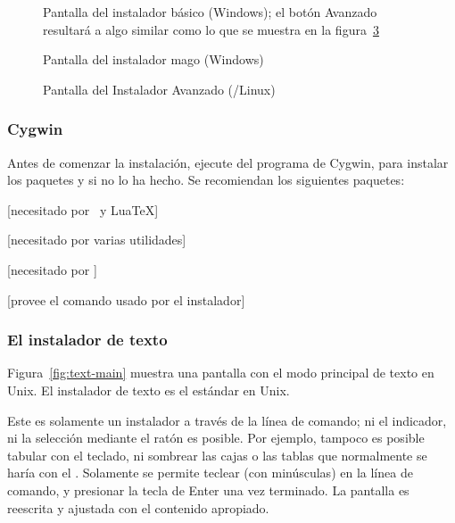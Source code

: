 \documentclass{article}
\begin{document}
\begin{figure}[tb]
	\caption{Pantalla del instalador básico (Windows);
	el botón Avanzado resultará a algo similar como lo
	que se muestra en la
	figura~\ref{fig:advanced-lnx}}\label{fig:basic-w32}
\end{figure}

\begin{figure}[tb]
\caption{Pantalla del instalador mago
	(Windows)}\label{fig:basic-w32}
\end{figure}

\begin{figure}[tb]
\caption{Pantalla del Instalador Avanzado \GUI{}
	(\GNU/Linux)}\label{fig:advanced-lnx}
\end{figure}

\subsubsection{Cygwin}
\label{sec:cygwin}

Antes de comenzar la instalación, ejecute  del
programa de Cygwin, para instalar los paquetes  y
 si no lo ha hecho. Se recomiendan los siguientes
paquetes:
\begin{itemize*}
	\item {}[necesitado por \XeTeX\ y Lua\TeX]
	\item {} [necesitado por varias utilidades]
	\item {} [necesitado por ]
	\item {} [provee el comando  usado por el instalador]
\end{itemize*}

\subsubsection{El instalador de texto}

Figura~\ref{fig:text-main} muestra una pantalla con el modo principal
de texto en Unix. El instalador de texto es el estándar en Unix. 

Este es solamente un instalador a través de la línea de comando; ni el
indicador, ni la selección mediante el ratón es posible. Por ejemplo,
tampoco es posible tabular con el teclado, ni sombrear las cajas o las
tablas que normalmente se haría con el \GUI. Solamente se permite
teclear (con minúsculas) en la línea de comando, y presionar la tecla
de Enter una vez terminado. La pantalla es reescrita y ajustada con el
contenido apropiado. 
\end{document}
